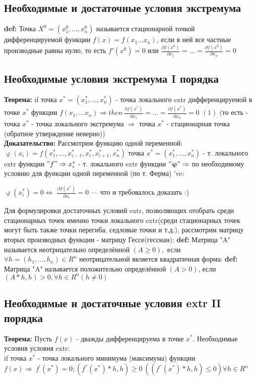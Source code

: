 \subsection*{Необходимые и достаточные условия экстремума}
\textbf{def:} Точка $X^0=(x^0_1,...,x^0_n)$ называется стационарной точкой дифференцируемой функции $f(x)=f(x_1... x_n)$, если в ней все частные производные равны нулю, то есть $f'(x^0)=0$ или $\frac{\partial f(x^0)}{\partial x_1} = ... = \frac{\partial f(x^0)}{\partial x_n} = 0$
\subsection*{Необходимые условия экстремума I порядка}
\textbf{Теорема: }if точка $x^*=(x_1^*, ..., x_n^*)$ - точка локального extr дифференцируемой в точке $x^* $ функции $ f(x_1, ... x_n) \Rightarrow then \ \frac{\partial f(x^*)}{\partial x_1} = ... = \frac{\partial f(x^*)}{\partial x_n} = 0$ $(1)$ (то есть - точка $x^{*}$ - точка локального экстремума $\Rightarrow$ точка $x^{*}$ - стационарная точка (обратное утверждение неверно)) \\ [2mm]
\textbf{Доказательство:} Рассмотрим функцию одной переменной:\\ $\upvarphi (x_i)=f(x_1^*,..., x_{i-1}^*, x_i^*, x_{i+1}^*, x_n^*)$ точка $x^*=(x_1^*,...,x_n^*)$ - т. локального extr функции $"f" \Rightarrow x_i^*$ - т. локального extr функции $"\upvarphi" \Rightarrow$ по необходимому условию для функции одной переменной (по т. Ферма) 've:
\begin{center}
$\upvarphi(x_i^*)=0 \Leftrightarrow $ $\frac{\partial f(x^*)}{\partial x_i} = 0$ --- что и требовалось доказать :)
\end{center}
Для формулировки достаточных условий extr, позволяющих отобрать среди стационарных точек именно точки локального extr(среди стационарных точек могут быть также точки перегиба, седловые точки и т.д.), рассмотрим матрицу вторых производных функции - матрицу Гессе(гессиан):
\textbf{def:} Матрица "A" называется неотрицательно определённой $(A \geq 0),$  если $\forall h = (h_1,...,h_n) \in R^n$ неотрицательной является квадратичная форма:
\textbf{def:} Матрица "A" называется положительно определённой $(A>0)$, если $(A*h, h)>0, \forall h \in R^n (h \neq 0)$

\subsection*{Необходимые и достаточные условия extr II порядка}
\textbf{Теорема:} Пусть $f(x)$ - дважды дифференцируема в точке $x^*$. Необходимые условия условия extr: \\
if точка $x^*$ - точка локального минимума (максимума) функции $
f(x) \Rightarrow \  f^{'}(x^*)=0; (f^{''}(x^*)*h, h) \geq 0 \ ((f^{''}(x^*)*h, h) \leq 0) \forall h \in R^n$

